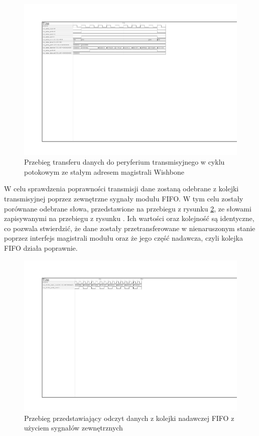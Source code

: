 \begin{figure}[H]
	\centering
	\includegraphics[scale=1,trim={2.54cm 14cm 11.1cm 2.9cm},clip]{testing/test-fifo-constant-8.pdf}
	\caption{Przebieg transferu danych do peryferium transmisyjnego w cyklu potokowym ze stałym adresem magistrali Wishbone}
	\label{fig:test-fifo-constant-8}
\end{figure}

W celu sprawdzenia poprawności transmisji dane zostaną odebrane z kolejki transmisyjnej poprzez zewnętrzne sygnały modułu FIFO. W tym celu zostały porównane odebrane słowa, przedstawione na przebiegu z rysunku \ref{fig:test-fifo-valid-8}, ze słowami zapisywanymi na przebiegu z rysunku \label{fig:test-fifo-constant-8}. Ich wartości oraz kolejność są identyczne, co pozwala stwierdzić, że dane zostały przetransferowane w nienaruszonym stanie poprzez interfejs magistrali modułu oraz że jego część nadawcza, czyli kolejka FIFO działa poprawnie.

\begin{figure}[H]
	\centering
	\includegraphics[scale=1,trim={2.54cm 17cm 13.3cm 2.9cm},clip]{testing/test-fifo-valid-8.pdf}
	\caption{Przebieg przedstawiający odczyt danych z kolejki nadawczej FIFO z użyciem sygnałów zewnętrznych}
	\label{fig:test-fifo-valid-8}
\end{figure}

